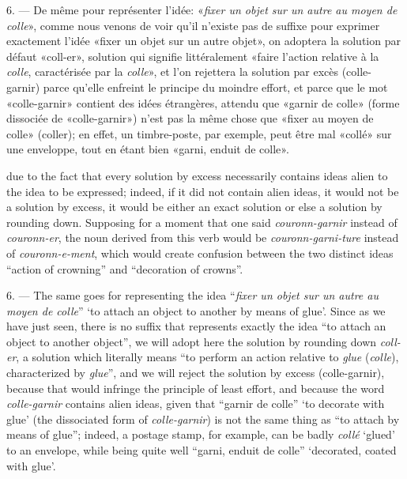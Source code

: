 \begin{sloppypar}
{  6. — De même pour représenter l'idée: «\emph{fixer un objet sur un
    autre au moyen de colle}», comme nous venons de voir qu’il
  n’existe pas de suffixe pour exprimer exactement l’idée «fixer un
  objet sur un autre objet», on adoptera la solution par défaut
  «coll-er», solution qui signifie littéralement «faire l’action
  relative à la \emph{colle}, caractérisée par la \emph{colle}», et
  l’on rejettera la solution par excès (colle-garnir) parce qu’elle
  enfreint le principe du moindre effort, et parce que le mot
  «colle-garnir» contient des idées étrangères, attendu que «garnir de
  colle» (forme dissociée de «colle-garnir») n’est pas la même chose
  que «fixer au moyen de colle» (coller); en effet, un timbre-poste,
  par exemple, peut être mal «collé» sur une enveloppe, tout en étant
  bien «garni, enduit de colle».

}
%
{\noindent
  due to the fact that every solution by excess necessarily contains
  ideas alien to the idea to be expressed; indeed, if it did not
  contain alien ideas, it would not be a solution by excess, it would
  be either an exact solution or else a solution by rounding
  down. Supposing for a moment that one said \emph{couronn-garnir}
  instead of \emph{couronn-er}, the noun derived from this verb would
  be \emph{couronn-garni-ture} instead of \emph{couronn-e-ment}, which
  would create confusion between the two distinct ideas ``action of
  crowning'' and ``decoration of crowns''.

  6. --- The same goes for representing the idea ``\emph{fixer un
    objet sur un autre au moyen de colle}'' `to attach an object to
  another by means of glue'. Since as we have just seen, there is no
  suffix that represents exactly the idea ``to attach an object to
  another object'', we will adopt here the solution by rounding down
  \emph{coll-er}, a solution which literally means ``to perform an action
  relative to \emph{glue} (\emph{colle}), characterized by \emph{glue}'', and
  we will reject the solution by excess (colle-garnir), because that
  would infringe the principle of least effort, and because the word
  \emph{colle-garnir} contains alien ideas, given that ``garnir de
  colle'' `to decorate with glue' (the dissociated form of
  \emph{colle-garnir}) is not the same thing as ``to attach by means of
  glue''; indeed, a postage stamp, for example, can be badly
  \emph{collé} `glued' to an envelope, while being quite well ``garni,
  enduit de colle'' `decorated, coated with glue'.

}


\end{sloppypar}
